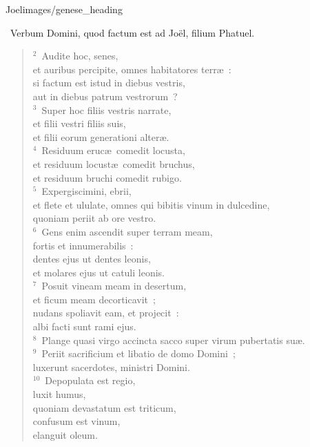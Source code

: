 {Joel}{images/genese_heading}

~\lettrine[lines=10,image=true,loversize=0.05,lraise=-0.03]{V}{}erbum Domini, quod factum est ad Jo\"el, filium Phatuel.
\begin{flushleft}\begin{verse}\vspace{6pt}${}^{2}$~Audite hoc, senes,\\ et auribus percipite, omnes habitatores terr\ae~:\\ si factum est istud in diebus vestris,\\ aut in diebus patrum vestrorum~?\\
${}^{3}$~Super hoc filiis vestris narrate,\\ et filii vestri filiis suis,\\ et filii eorum generationi alter\ae .\\
${}^{4}$~Residuum eruc\ae\ comedit locusta,\\ et residuum locust\ae\ comedit bruchus,\\ et residuum bruchi comedit rubigo.\\
${}^{5}$~Expergiscimini, ebrii,\\ et flete et ululate, omnes qui bibitis vinum in dulcedine,\\ quoniam periit ab ore vestro.\\
${}^{6}$~Gens enim ascendit super terram meam,\\ fortis et innumerabilis~:\\ dentes ejus ut dentes leonis,\\ et molares ejus ut catuli leonis.\\
${}^{7}$~Posuit vineam meam in desertum,\\ et ficum meam decorticavit~;\\ nudans spoliavit eam, et projecit~:\\ albi facti sunt rami ejus.\\
${}^{8}$~Plange quasi virgo accincta sacco super virum pubertatis su\ae .\\
${}^{9}$~Periit sacrificium et libatio de domo Domini~;\\ luxerunt sacerdotes, ministri Domini.\\
${}^{10}$~Depopulata est regio,\\ luxit humus,\\ quoniam devastatum est triticum,\\ confusum est vinum,\\ elanguit oleum.\\

\end{verse}
\end{flushleft}
